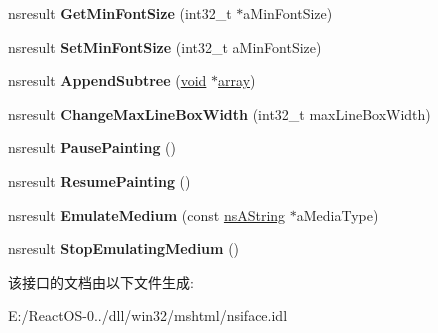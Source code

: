 \begin{DoxyCompactItemize}
\item 
\mbox{\label{interfacens_i_content_viewer_a9ddfd77a29f5919d674925de234ebeb7}} 
nsresult {\bfseries Get\+Min\+Font\+Size} (int32\+\_\+t $\ast$a\+Min\+Font\+Size)
\item 
\mbox{\label{interfacens_i_content_viewer_a2b9083d75736896a222989f2b8cc9de5}} 
nsresult {\bfseries Set\+Min\+Font\+Size} (int32\+\_\+t a\+Min\+Font\+Size)
\item 
\mbox{\label{interfacens_i_content_viewer_abfa835c04e6106055d11e772a5aa8c04}} 
nsresult {\bfseries Append\+Subtree} (\hyperlink{interfacevoid}{void} $\ast$\hyperlink{structarray}{array})
\item 
\mbox{\label{interfacens_i_content_viewer_a2ebcf25886598a7f76224b8d25d2d979}} 
nsresult {\bfseries Change\+Max\+Line\+Box\+Width} (int32\+\_\+t max\+Line\+Box\+Width)
\item 
\mbox{\label{interfacens_i_content_viewer_a9dcefda3faa5ab8e695808c5a238a41f}} 
nsresult {\bfseries Pause\+Painting} ()
\item 
\mbox{\label{interfacens_i_content_viewer_a2a41fe4bec39aa3a3bf08ce63252f2ee}} 
nsresult {\bfseries Resume\+Painting} ()
\item 
\mbox{\label{interfacens_i_content_viewer_aaddae150622361bf2d9091f535255c35}} 
nsresult {\bfseries Emulate\+Medium} (const \hyperlink{structns_string_container}{ns\+A\+String} $\ast$a\+Media\+Type)
\item 
\mbox{\label{interfacens_i_content_viewer_a575b1db30b4ca48b9532e5ad9a1091c0}} 
nsresult {\bfseries Stop\+Emulating\+Medium} ()
\end{DoxyCompactItemize}


该接口的文档由以下文件生成\+:\begin{DoxyCompactItemize}
\item 
E\+:/\+React\+O\+S-\/0../dll/win32/mshtml/nsiface.\+idl\end{DoxyCompactItemize}
